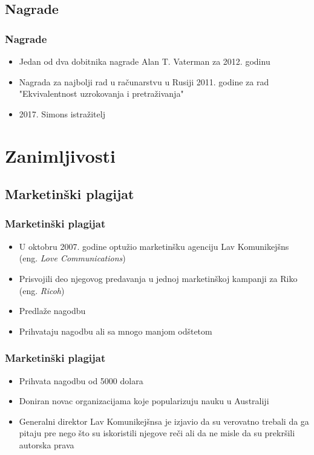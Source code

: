 \documentclass{beamer}
\begin{document}
\subsection{Nagrade}
\begin{frame}[fragile]\frametitle{Nagrade}
	\begin{itemize}	
		\item Jedan od dva dobitnika nagrade Alan T. Vaterman za 2012. godinu
		\item Nagrada za najbolji rad u računarstvu u Rusiji 2011. godine za rad "Ekvivalentnost uzrokovanja i pretraživanja"
		\item 2017. Simons istražitelj
	\end{itemize}
\end{frame}


\section{Zanimljivosti}
\subsection{Marketinški plagijat}
\begin{frame}[fragile]\frametitle{Marketinški plagijat}
	\begin{itemize}
		\item<2-> U oktobru 2007. godine optužio marketinšku agenciju Lav Komunikejšns (eng. \textit{Love Communications})
		\item<2-> Prisvojili deo njegovog predavanja u jednoj marketinškoj kampanji za Riko (eng. \textit{Ricoh})
		\item<3-> Predlaže nagodbu
		\item<4-> Prihvataju nagodbu ali sa mnogo manjom odštetom
	\end{itemize}
\end{frame}

\begin{frame}[fragile]\frametitle{Marketinški plagijat}
	\begin{itemize}
		\item<1-> Prihvata nagodbu od 5000 dolara
		\item<2-> Doniran novac organizacijama koje popularizuju nauku u Australiji
		\item<3-> Generalni direktor Lav Komunikejšnsa je izjavio da su verovatno trebali da ga pitaju 
		pre nego što su iskoristili njegove reči ali da ne misle da su prekršili autorska prava
		
	\end{itemize}
\end{frame}
\end{document}
